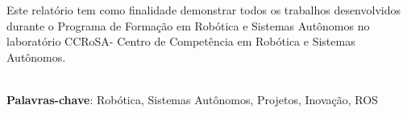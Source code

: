 \begin{thesisresumo}
Este relatório tem como finalidade demonstrar todos os trabalhos desenvolvidos durante o Programa de Formação em Robótica e Sistemas Autônomos no laboratório CCRoSA- Centro de Competência em Robótica e Sistemas Autônomos.



\ \\


\textbf{Palavras-chave}: Robótica, Sistemas Autônomos, Projetos, Inovação, ROS

\end{thesisresumo}
